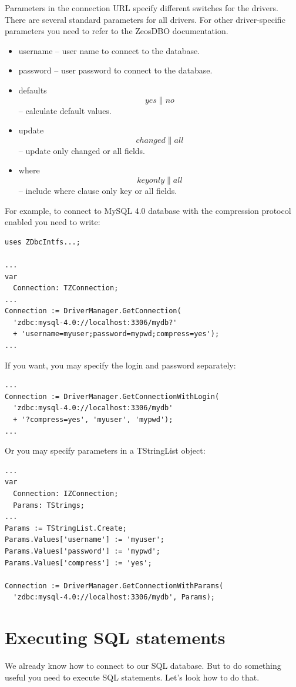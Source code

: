 \documentclass[a4paper,12pt,oneside]{book}
\begin{document}
Parameters in the connection URL specify different switches for the drivers.
There are several standard parameters for all drivers.
For other driver-specific parameters you need to refer to the ZeosDBO documentation. 
\begin{itemize}
  \item username – user name to connect to the database.
  \item password – user password to connect to the database.
  \item defaults \[yes \| no\] – calculate default values.
  \item update \[changed \| all\] – update only changed or all fields.
  \item where \[keyonly \| all\] – include where clause only key or all fields.
\end{itemize}

For example, to connect to MySQL 4.0 database with the compression protocol enabled you need to write:
\begin{verbatim}
uses ZDbcIntfs...;

...
var
  Connection: TZConnection;
...
Connection := DriverManager.GetConnection(
  'zdbc:mysql-4.0://localhost:3306/mydb?'
  + 'username=myuser;password=mypwd;compress=yes');
...
\end{verbatim}

If you want, you may specify the login and password separately: 

\begin{verbatim}
...
Connection := DriverManager.GetConnectionWithLogin(
  'zdbc:mysql-4.0://localhost:3306/mydb'
  + '?compress=yes', 'myuser', 'mypwd');
...
\end{verbatim}

Or you may specify parameters in a TStringList object:

\begin{verbatim}
...
var
  Connection: IZConnection;
  Params: TStrings;
...
Params := TStringList.Create;
Params.Values['username'] := 'myuser';
Params.Values['password'] := 'mypwd';
Params.Values['compress'] := 'yes';

Connection := DriverManager.GetConnectionWithParams(
  'zdbc:mysql-4.0://localhost:3306/mydb', Params);
\end{verbatim}

\chapter{Executing SQL statements}
We already know how to connect to our SQL database. But to do something useful you need to execute SQL statements. Let's look how to do that.
\end{document}
